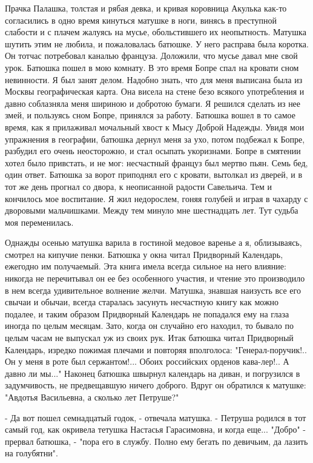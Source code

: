 Прачка Палашка,  толстая  и  рябая девка,  и  кривая  коровница Акулька
как-то согласились в одно время кинуться матушке в ноги, винясь в преступной
слабости и с плачем жалуясь на мусье,  обольстившего их неопытность. Матушка
шутить этим не любила, и пожаловалась батюшке. У него расправа была коротка.
Он тотчас потребовал каналью француза. Доложили,  что  мусье давал  мне свой
урок. Батюшка пошел в мою комнату. В  это время Бопре  спал  на кровати сном
невинности. Я был занят делом.  Надобно знать, что для меня выписана была из
Москвы географическая карта. Она висела на стене безо всякого употребления и
давно соблазняла меня шириною  и добротою бумаги.  Я решился  сделать из нее
змей, и пользуясь  сном Бопре, принялся за работу. Батюшка вошел  в то самое
время,  как я прилаживал мочальный  хвост к  Мысу Доброй  Надежды. Увидя мои
упражнения  в географии, батюшка дернул меня за ухо, потом подбежал к Бопре,
разбудил  его очень неосторожно, и стал осыпать укоризнами. Бопре в смятении
хотел было привстать, и не  мог: несчастный  француз был мертво  пьян.  Семь
бед, один  ответ. Батюшка  за  ворот приподнял  его  с кровати, вытолкал  из
дверей, и в тот  же  день прогнал со двора, к неописанной радости Савельича.
Тем и кончилось мое воспитание.
Я  жил  недорослем,  гоняя  голубей  и  играя  в  чахарду  с  дворовыми
мальчишками.  Между   тем   минуло  мне  шестнадцать  лет.  Тут  судьба  моя
переменилась.

Однажды   осенью  матушка  варила  в  гостиной  медовое  варенье  а  я,
облизываясь, смотрел  на кипучие  пенки.  Батюшка  у  окна читал  Придворный
Календарь, ежегодно им получаемый.  Эта книга  имела  всегда сильное на него
влияние: никогда  не перечитывал он ее без особенного участия, и  чтение это
производило  в нем  всегда  удивительное волнение  желчи.  Матушка,  знавшая
наизусть все его свычаи и обычаи, всегда старалась засунуть несчастную книгу
как можно подалее, и таким образом Придворный Календарь  не попадался ему на
глаза  иногда по  целым  месяцам. Зато,  когда он случайно  его находил,  то
бывало по  целым часам  не  выпускал  уж  из своих рук. Итак  батюшка  читал
Придворный  Календарь,  изредко  пожимая  плечами  и   повторяя  вполголоса:
"Генерал-поручик!.. Он  у  меня  в роте  был сержантом!... Обоих  российских
орденов кава-лер!.. А давно  ли мы..." Наконец батюшка швырнул  календарь на
диван, и погрузился в задумчивость, не предвещавшую ничего доброго.
Вдруг он  обратился  к  матушке:  "Авдотья Васильевна,  а  сколько  лет
Петруше?"

- Да вот пошел семнадцатый годок, - отвечала матушка. - Петруша родился
в тот самый год, как окривела тетушка Настасья Гарасимовна, и когда еще...
"Добро"  - прервал  батюшка, - "пора  его в службу. Полно ему бегать по
девичьим, да лазить на голубятни".

